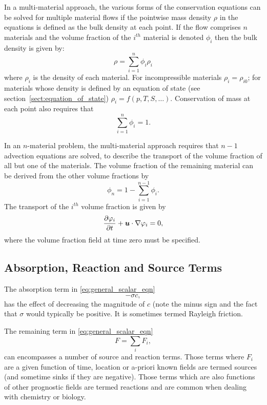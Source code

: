 In a multi-material approach, the various forms of the conservation equations can be solved for multiple material flows if the pointwise mass density $\rho$ in the equations is defined as the bulk density at each point.  If the flow comprises $n$ materials and the volume fraction of the $i^{th}$ material is denoted $\phi_i$ then the bulk density is given by:
\begin{equation}
\rho = \sum_{i=1}^n \phi_i\rho_i
\end{equation}
where $\rho_i$ is the density of each material.  For incompressible materials $\rho_i = \rho_{i0}$; for materials whose density is defined by an equation of state (see section~\ref{sect:equation_of_state}) $\rho_i = f(p,T,S,\ldots)$.  Conservation of mass at each point also requires that
\begin{equation}
\sum_{i=1}^n \phi_{i} = 1.
\end{equation}

In an $n$-material problem, the multi-material approach requires that $n-1$ advection equations are solved, to describe the transport of the volume fraction of all but one of the materials.  The volume fraction of the remaining material can be derived from the other volume fractions by
\begin{equation}\label{diagnosticvolfrac}
\phi_{n} = 1 - \sum_{i=1}^{n-1}\phi_{i}. 
\end{equation}
The transport of the $i^{th}$ volume fraction is given by  
\begin{equation}
\frac{\partial\varphi_i}{\partial t} + {\mbox{\boldmath$u$}}\cdot\nabla\varphi_i = 0,
\end{equation}
where the volume fraction field at time zero must be specified.


\subsection{Absorption, Reaction and Source Terms}

The absorption term in \eqref{eq:general_scalar_eqn} 
\begin{equation}\label{eq:scalar_absorption}
-\sigma c,
\end{equation}
has the effect of decreasing the magnitude of $c$ (note the minus sign and the fact 
that $\sigma$ would typically be positive. It is sometimes termed Rayleigh friction. 

The remaining term in \eqref{eq:general_scalar_eqn}
\begin{equation}\label{eq:scalar_source}
F = \sum_i F_i,
\end{equation}
can encompasses a number of source and reaction terms. Those terms where $F_i$ are
a given function of time, location or a-priori known fields are termed sources (and sometime
sinks if they are negative). Those terms which are also functions of other prognostic fields
are termed reactions and are common when dealing with chemistry or biology.


